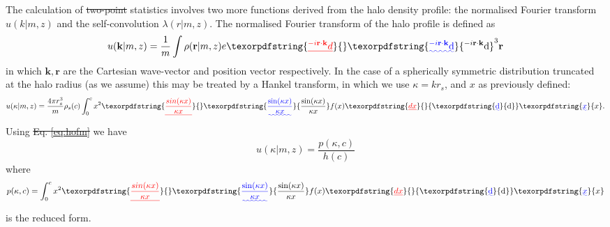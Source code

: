 \documentclass[5p,aas_macros]{elsarticle}
\providecommand{\DIFaddtex}[1]{{\protect\color{blue}\uwave{#1}}} %
\providecommand{\DIFdeltex}[1]{{\protect\color{red}\sout{#1}}}                      %
\providecommand{\DIFaddbegin}{} %
\providecommand{\DIFaddend}{} %
\providecommand{\DIFdelbegin}{} %
\providecommand{\DIFdelend}{} %
\providecommand{\DIFadd}[1]{\texorpdfstring{\DIFaddtex{#1}}{#1}} %
\providecommand{\DIFdel}[1]{\texorpdfstring{\DIFdeltex{#1}}{}} %
\begin{document}
The calculation of \DIFdelbegin \DIFdel{two-point }\DIFdelend \DIFaddbegin \DIFadd{2-point }\DIFaddend statistics involves two more functions derived from the halo density profile: the normalised Fourier transform $u(k|m,z)$ and the self-convolution $\lambda(r|m,z)$. The normalised Fourier transform of the halo profile is defined as \citep{Cooray2002}
\begin{equation}
\label{eq:ugeneral}
u(\mathbf{k}|m,z) = \frac{1}{m}\int \rho(\mathbf{r}|m,z) e\DIFdelbegin \DIFdel{^{-i\mathbf{r}\cdot\mathbf{k}}d}\DIFdelend \DIFaddbegin \DIFadd{^{-i\mathbf{r}\cdot\mathbf{k}}{\rm d}}\DIFaddend ^3\mathbf{r}
\end{equation}
in which $\mathbf{k},\mathbf{r}$ are the Cartesian wave-vector and position vector respectively.
In the case of a spherically symmetric distribution truncated at the halo radius (as we assume) this may be treated by a Hankel transform, in which we use $\kappa = kr_s$, and $x$ as previously defined:
\begin{equation}
u(\kappa|m,z) = \frac{4\pi r_s^3}{m}\rho_s(c)\int_0^c x^2 \DIFdelbegin \DIFdel{\frac{sin(\kappa x)}{\kappa x}}\DIFdelend \DIFaddbegin \DIFadd{\frac{\sin(\kappa x)}{\kappa x}}\DIFaddend f(x) \DIFdelbegin \DIFdel{dx}\DIFdelend \DIFaddbegin {\rm \DIFadd{d}}\DIFadd{x}\DIFaddend .
\end{equation}
Using \DIFdelbegin \DIFdel{Eq. \ref{eq:hofm} }\DIFdelend \DIFaddbegin \DIFadd{\mbox{%
\cref{eq:hofm} }\hspace{0pt}%
}\DIFaddend we have
\begin{equation}
\label{eq:uspherical}
u(\kappa |m,z) = \frac{p(\kappa,c)}{h(c)}
\end{equation}
where
\begin{equation}
\label{eq:pofck}
p(\kappa,c) = \int_0^c x^2 \DIFdelbegin \DIFdel{\frac{sin(\kappa x)}{\kappa x}}\DIFdelend \DIFaddbegin \DIFadd{\frac{\sin(\kappa x)}{\kappa x}}\DIFaddend f(x) \DIFdelbegin \DIFdel{dx
}\DIFdelend \DIFaddbegin {\rm \DIFadd{d}}\DIFadd{x
}\DIFaddend \end{equation}
is the reduced form.
\end{document}
